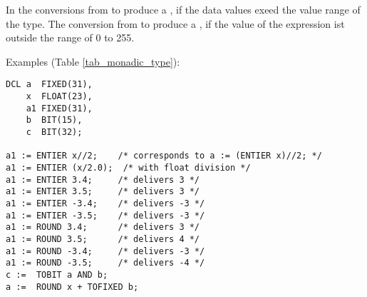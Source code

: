 In \OpenPEARL{} the conversions from  to  produce a 
, if the
data values exeed the value range of the  type.
The conversion from  to  produce a ,
if the value of the  expression ist outside the range of 0 to 255.

Examples (Table \ref{tab_monadic_type}):

\begin{lstlisting}
DCL a  FIXED(31),
    x  FLOAT(23),
    a1 FIXED(31),
    b  BIT(15),
    c  BIT(32);

a1 := ENTIER x//2;    /* corresponds to a := (ENTIER x)//2; */ 
a1 := ENTIER (x/2.0);  /* with float division */
a1 := ENTIER 3.4;     /* delivers 3 */ 
a1 := ENTIER 3.5;     /* delivers 3 */ 
a1 := ENTIER -3.4;    /* delivers -3 */
a1 := ENTIER -3.5;    /* delivers -3 */
a1 := ROUND 3.4;      /* delivers 3 */ 
a1 := ROUND 3.5;      /* delivers 4 */ 
a1 := ROUND -3.4;     /* delivers -3 */ 
a1 := ROUND -3.5;     /* delivers -4 */
c :=  TOBIT a AND b;
a :=  ROUND x + TOFIXED b; 
\end{lstlisting}
\FloatBarrier

